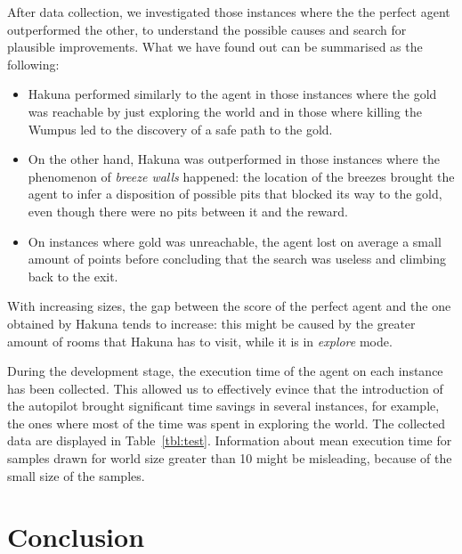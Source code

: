 \documentclass{llncs}
\begin{document}
After data collection, we investigated those instances where the the perfect agent outperformed the other, to understand the possible causes and search for plausible improvements.
What we have found out can be summarised as the following:
\begin{itemize}
	\item Hakuna performed similarly to the agent in those instances where the gold was reachable by just exploring the world and in those where killing the Wumpus led to the discovery of a safe path to the gold.
	\item On the other hand, Hakuna was outperformed in those instances where the phenomenon of \emph{breeze walls} happened: the location of the breezes brought the agent to infer a disposition of possible pits that blocked its way to the gold, even though there were no pits between it and the reward.
	\item On instances where gold was unreachable, the agent lost on average a small amount of points before concluding that the search was useless and climbing back to the exit.
\end{itemize}

With increasing sizes, the gap between the score of the perfect agent and the one obtained by Hakuna tends to increase: this might be caused by the greater amount of rooms that Hakuna has to visit, while it is in \emph{explore} mode. 

During the development stage, the execution time of the agent on each instance has been collected.
This allowed us to effectively evince that the introduction of the autopilot brought significant time savings in several instances, for example, the ones where most of the time was spent in exploring the world.
The collected data are displayed in Table~\ref{tbl:test}. Information about mean execution time for samples drawn for world size greater than 10 might be misleading, because of the small size of the samples.

\section{Conclusion}
\end{document}
